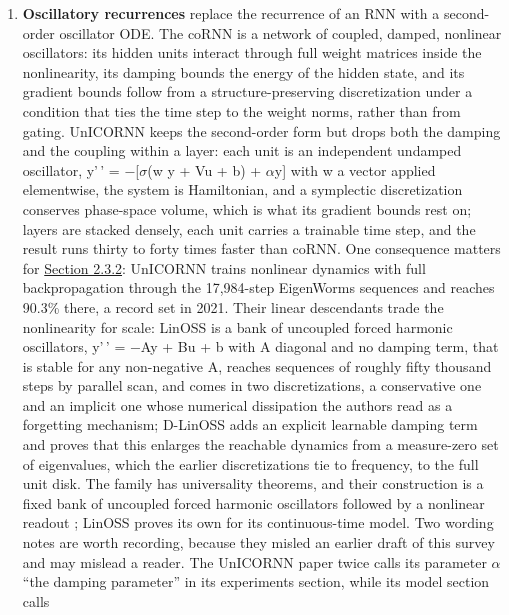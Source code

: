 \documentclass[10pt]{article}
\providecommand{\tightlist}{%
  \setlength{\itemsep}{0pt}\setlength{\parskip}{0pt}}
\begin{document}
\begin{enumerate}
\def\labelenumi{\arabic{enumi}.}
\tightlist
\item
  \textbf{Oscillatory recurrences} replace the recurrence of an RNN with
  a second-order oscillator ODE. The coRNN \citep{rusch2021} is a
  network of coupled, damped, nonlinear oscillators: its hidden units
  interact through full weight matrices inside the nonlinearity, its
  damping bounds the energy of the hidden state, and its gradient bounds
  follow from a structure-preserving discretization under a condition
  that ties the time step to the weight norms, rather than from gating.
  UnICORNN \citep{unicornn} keeps the second-order form but drops both
  the damping and the coupling within a layer: each unit is an
  independent undamped oscillator, y'\,' =
  \ensuremath{-}{[}\ensuremath{\sigma}(w y + Vu + b) +
  \ensuremath{\alpha}y{]} with w a vector applied elementwise, the
  system is Hamiltonian, and a symplectic discretization conserves
  phase-space volume, which is what its gradient bounds rest on; layers
  are stacked densely, each unit carries a trainable time step, and the
  result runs thirty to forty times faster than coRNN. One consequence
  matters for \hyperref[sec-2-3-2]{Section 2.3.2}: UnICORNN trains
  nonlinear dynamics with full backpropagation through the 17,984-step
  EigenWorms sequences and reaches 90.3\% there, a record set in 2021.
  Their linear descendants trade the nonlinearity for scale: LinOSS
  \citep{rusch2025} is a bank of uncoupled forced harmonic oscillators,
  y'\,' = \ensuremath{-}Ay + Bu + b with A diagonal and no damping term,
  that is stable for any non-negative A, reaches sequences of roughly
  fifty thousand steps by parallel scan, and comes in two
  discretizations, a conservative one and an implicit one whose
  numerical dissipation the authors read as a forgetting mechanism;
  D-LinOSS \citep{d-linoss} adds an explicit learnable damping term and
  proves that this enlarges the reachable dynamics from a measure-zero
  set of eigenvalues, which the earlier discretizations tie to
  frequency, to the full unit disk. The family has universality
  theorems, and their construction is a fixed bank of uncoupled forced
  harmonic oscillators followed by a nonlinear readout
  \citep{lanthaler2023}; LinOSS proves its own for its continuous-time
  model. Two wording notes are worth recording, because they misled an
  earlier draft of this survey and may mislead a reader. The UnICORNN
  paper twice calls its parameter \ensuremath{\alpha} ``the damping
  parameter'' in its experiments section, while its model section calls

\end{enumerate}
\end{document}
